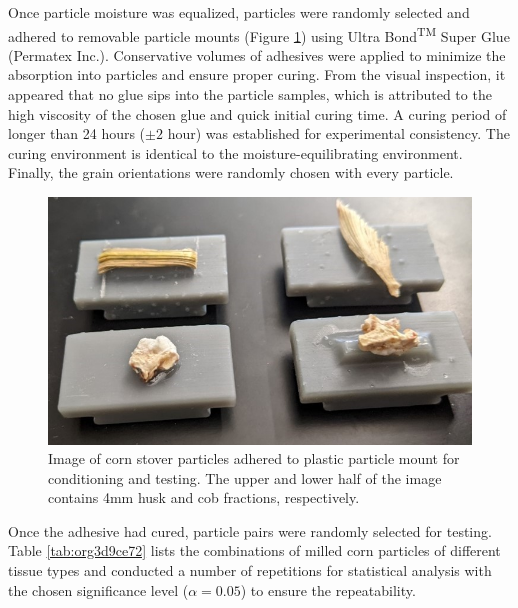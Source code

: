 \documentclass[xcolor=dvipsnames,10pt,hidelinks]{article}
\begin{document}
Once particle moisture was equalized, particles were randomly selected and adhered to removable particle mounts (Figure \ref{fig:org531e427}) using Ultra Bond\textsuperscript{TM} Super Glue (Permatex Inc.).
Conservative volumes of adhesives were applied to minimize the absorption into particles and ensure proper curing.
From the visual inspection, it appeared that no glue sips into the particle samples,
which is attributed to the high viscosity of the chosen glue and quick initial curing time.
A curing period of longer than 24 hours (\(\pm 2\) hour) was established for experimental consistency.
The curing environment is identical to the moisture-equilibrating environment.
Finally, the grain orientations were randomly chosen with every particle.

\begin{figure}[htbp]
\centering
\includegraphics[width=.9\linewidth]{figures/image4.jpg}
\caption{\label{fig:org531e427}Image of corn stover particles adhered to plastic particle mount for conditioning and testing. The upper and lower half of the image contains 4mm husk and cob fractions, respectively.}
\end{figure}

Once the adhesive had cured, particle pairs were randomly selected for testing.
Table \ref{tab:org3d9ce72} lists the combinations of milled corn particles of different tissue types and conducted a number of repetitions for statistical analysis with the chosen significance level (\(\alpha = 0.05\)) to ensure the repeatability.
\end{document}
